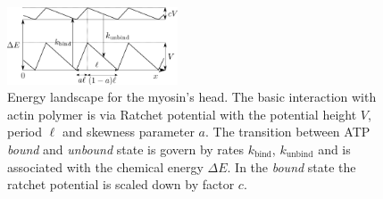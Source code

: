 \documentclass[aps,pre,twocolumn,showpacs,showkeys]{revtex4-1}
\begin{document}
\begin{figure}[t]
\centering
\includegraphics[width=0.45\textwidth,height=!]{energy}
\caption{Energy landscape for the myosin's head.
The basic interaction with actin polymer is via Ratchet potential with the potential height $V$, period $\ell$ and skewness parameter $a$.
The transition between ATP \emph{bound} and \emph{unbound} state is govern by rates $k_\text{bind}$, $k_\text{unbind}$ 
and is associated with the chemical energy $\Delta E$.
In the \emph{bound} state the ratchet potential is scaled down by factor $c$. 
}
\label{Fig: energy}
\end{figure}
\end{document}
